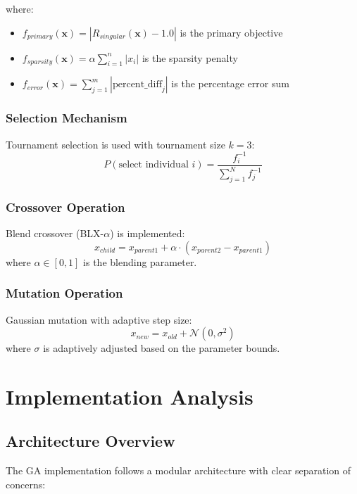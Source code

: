 \documentclass[12pt,a4paper]{article}
\begin{document}
where:
\begin{itemize}
    \item $f_{primary}(\mathbf{x}) = |R_{singular}(\mathbf{x}) - 1.0|$ is the primary objective
    \item $f_{sparsity}(\mathbf{x}) = \alpha \sum_{i=1}^{n} |x_i|$ is the sparsity penalty
    \item $f_{error}(\mathbf{x}) = \sum_{j=1}^{m} |\text{percent\_diff}_j|$ is the percentage error sum
\end{itemize}

\subsubsection{Selection Mechanism}
Tournament selection is used with tournament size $k = 3$:
\begin{equation}
    P(\text{select individual } i) = \frac{f_i^{-1}}{\sum_{j=1}^{N} f_j^{-1}}
\end{equation}

\subsubsection{Crossover Operation}
Blend crossover (BLX-$\alpha$) is implemented:
\begin{equation}
    x_{child} = x_{parent1} + \alpha \cdot (x_{parent2} - x_{parent1})
\end{equation}
where $\alpha \in [0, 1]$ is the blending parameter.

\subsubsection{Mutation Operation}
Gaussian mutation with adaptive step size:
\begin{equation}
    x_{new} = x_{old} + \mathcal{N}(0, \sigma^2)
\end{equation}
where $\sigma$ is adaptively adjusted based on the parameter bounds.

\section{Implementation Analysis}

\subsection{Architecture Overview}
The GA implementation follows a modular architecture with clear separation of concerns:
\end{document}
